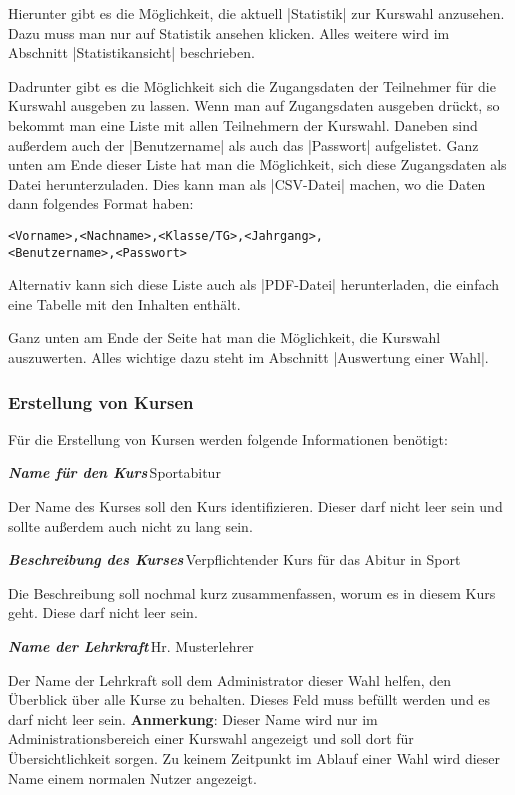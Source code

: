\documentclass[ngerman]{ltxdoc}
\newcommand{\DescribeOption}[4]{
  \DescribeMacro{#1}
  \begin{minipage}[t]{\textwidth}
    \textit{\textbf{\textcolor{mLightGreen}{#2}}}\dotfill\,#3\par
    \begingroup
    \vspace{0.5em}#4\par
    \endgroup
  \end{minipage}
}
\begin{document}
Hierunter gibt es die Möglichkeit, die aktuell |Statistik| zur Kurswahl anzusehen.
Dazu muss man nur auf \glqq Statistik ansehen\grqq{} klicken. Alles weitere wird im
Abschnitt |Statistikansicht| beschrieben.

Dadrunter gibt es die Möglichkeit sich die Zugangsdaten der Teilnehmer für die
Kurswahl ausgeben zu lassen. Wenn man auf \glqq Zugangsdaten ausgeben\grqq{} drückt,
so bekommt man eine Liste mit allen Teilnehmern der Kurswahl. Daneben sind außerdem
auch der |Benutzername| als auch das |Passwort| aufgelistet. Ganz unten am Ende
dieser Liste hat man die Möglichkeit, sich diese Zugangsdaten als Datei herunterzuladen.
Dies kann man als |CSV-Datei| machen, wo die Daten dann folgendes Format haben:

\begin{lstlisting}[style=tex]
<Vorname>,<Nachname>,<Klasse/TG>,<Jahrgang>,
<Benutzername>,<Passwort>
\end{lstlisting}

Alternativ kann sich diese Liste auch als |PDF-Datei| herunterladen, die einfach
eine Tabelle mit den Inhalten enthält.

Ganz unten am Ende der Seite hat man die Möglichkeit, die Kurswahl auszuwerten.
Alles wichtige dazu steht im Abschnitt |Auswertung einer Wahl|.

\subsubsection{Erstellung von Kursen}

Für die Erstellung von Kursen werden folgende Informationen benötigt:

\DescribeOption{Kursname}{Name für den Kurs}{Sportabitur}{
  Der Name des Kurses soll den Kurs identifizieren. Dieser darf nicht leer sein
  und sollte außerdem auch nicht zu lang sein.
}

\DescribeOption{Beschreibung}{Beschreibung des Kurses}{Verpflichtender Kurs für das Abitur in Sport}{
  Die Beschreibung soll nochmal kurz zusammenfassen, worum es in diesem Kurs geht. Diese
  darf nicht leer sein.
}

\DescribeOption{Lehrkraft}{Name der Lehrkraft}{Hr. Musterlehrer}{
  Der Name der Lehrkraft soll dem Administrator dieser Wahl helfen, den Überblick
  über alle Kurse zu behalten. Dieses Feld muss befüllt werden und es darf nicht
  leer sein.
  \textbf{Anmerkung}: Dieser Name wird nur im Administrationsbereich einer Kurswahl
  angezeigt und soll dort für Übersichtlichkeit sorgen. Zu keinem Zeitpunkt im
  Ablauf einer Wahl wird dieser Name einem normalen Nutzer angezeigt.
}
\end{document}
